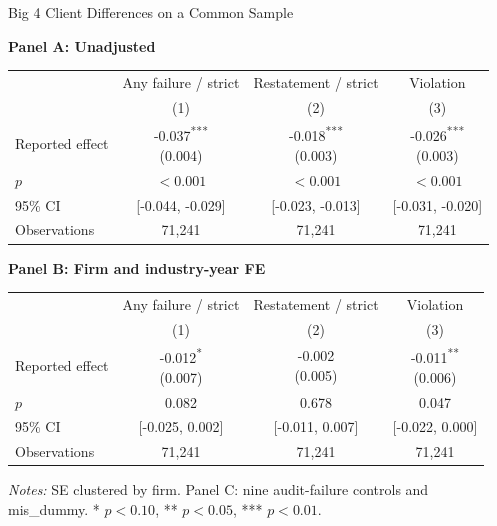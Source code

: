\documentclass[10pt]{article}
\newcommand{\sym}[1]{\textsuperscript{#1}}
\begin{document}
\fontsize{10}{12}\selectfont
\setlength{\tabcolsep}{3pt}\renewcommand{\arraystretch}{1.15}
\begin{center}\large Big 4 Client Differences on a Common Sample\end{center}
\medskip\textbf{Panel A: Unadjusted}\par\smallskip
\begin{tabular*}{\textwidth}{@{\extracolsep{\fill}}lccc@{}}
\toprule
 & Any failure / strict & Restatement / strict & Violation \\
 & (1) & (2) & (3) \\
\midrule
Reported effect & \shortstack{-0.037\sym{***}\\(0.004)} & \shortstack{-0.018\sym{***}\\(0.003)} & \shortstack{-0.026\sym{***}\\(0.003)} \\
$p$ & $<0.001$ & $<0.001$ & $<0.001$ \\
95\% CI & [-0.044, -0.029] & [-0.023, -0.013] & [-0.031, -0.020] \\
Observations & 71,241 & 71,241 & 71,241 \\
\bottomrule\end{tabular*}\par
\medskip\textbf{Panel B: Firm and industry-year FE}\par\smallskip
\begin{tabular*}{\textwidth}{@{\extracolsep{\fill}}lccc@{}}
\toprule
 & Any failure / strict & Restatement / strict & Violation \\
 & (1) & (2) & (3) \\
\midrule
Reported effect & \shortstack{-0.012\sym{*}\\(0.007)} & \shortstack{-0.002\\(0.005)} & \shortstack{-0.011\sym{**}\\(0.006)} \\
$p$ & 0.082 & 0.678 & 0.047 \\
95\% CI & [-0.025, 0.002] & [-0.011, 0.007] & [-0.022, 0.000] \\
Observations & 71,241 & 71,241 & 71,241 \\
\bottomrule\end{tabular*}\par
\medskip\fontsize{9}{11}\selectfont\textit{Notes:} SE clustered by firm. Panel C: nine audit-failure controls and mis\_dummy. * $p<0.10$, ** $p<0.05$, *** $p<0.01$.
\end{document}
